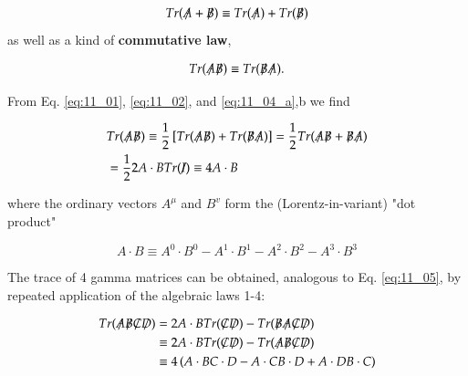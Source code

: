\begin{subequations}\label{eq:11_04}
    \begin{equation}\label{eq:11_04_a}
        Tr(\tr{A} + \tr{B}) \equiv \Tr{A} + \Tr{B}
    \end{equation}
\end{subequations}
as well as a kind of \textbf{commutative law},

\begin{equation}\label{eq:11_04_b}
    Tr(\tr{A} \tr{B}) \equiv Tr(\tr{B} \tr{A}).
\end{equation}

From Eq. \eqref{eq:11_01}, \eqref{eq:11_02}, and \eqref{eq:11_04_a},b we find

\begin{align}\label{eq:11_05}
    & Tr(\tr{A} \tr{B}) \equiv \frac{1}{2} \left[ Tr(\tr{A} \tr{B}) + Tr(\tr{B} \tr{A}) \right] = \frac{1}{2} Tr(\tr{A} \tr{B} + \tr{B} \tr{A}) \nonumber \\
    & = \frac{1}{2} 2 A \cdot B \Tr{I} \equiv 4 A \cdot B
\end{align}

where the ordinary vectors $A^{\mu}$ and $B^{v}$ form the (Lorentz-in-variant) "dot product"

\begin{equation}\label{eq:11_06}
A \cdot B \equiv A^{0} \cdot B^{0} - A^{1} \cdot B^{1} - A^{2} \cdot B^{2} - A^{3} \cdot B^{3}
\end{equation}

The trace of 4 gamma matrices can be obtained, analogous to Eq. \eqref{eq:11_05}, by repeated application of the algebraic laws 1-4:

\begin{align}\label{eq:11_07}
Tr(\tr{A}\tr{B}\tr{C}\tr{D}) & = 2A\cdot B Tr(\tr{C}\tr{D}) - Tr(\tr{B}\tr{A}\tr{C}\tr{D}) \nonumber \\
& \equiv 2 A\cdot B Tr(\tr{C}\tr{D}) - Tr(\tr{A}\tr{B}\tr{C}\tr{D}) \\
& \equiv 4 \left(A\cdot B C \cdot D - A\cdot C B\cdot D + A\cdot D B \cdot C \right) \nonumber 
\end{align}

